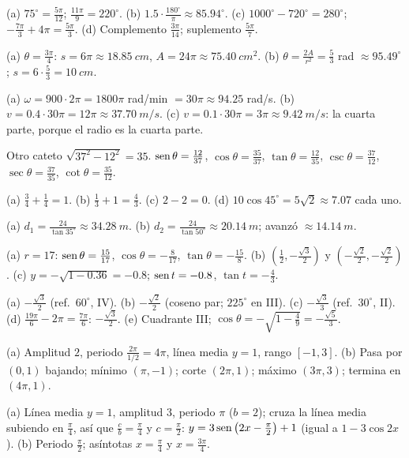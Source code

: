 \documentclass[11pt,a4paper]{article}
\begin{document}
\respuestas
\begin{respuestascortas}
\begin{soluciones}
\item (a) $75^\circ=\tfrac{5\pi}{12}$; $\tfrac{11\pi}{9}=220^\circ$. (b) $1.5\cdot\tfrac{180^\circ}{\pi}\approx85.94^\circ$.
  (c) $1000^\circ-720^\circ=280^\circ$; $-\tfrac{7\pi}{3}+4\pi=\tfrac{5\pi}{3}$. (d) Complemento $\tfrac{3\pi}{14}$; suplemento $\tfrac{5\pi}{7}$.
\item (a) $\theta=\tfrac{3\pi}{4}$: $s=6\pi\approx\SI{18.85}{cm}$, $A=24\pi\approx\SI{75.40}{cm^2}$.
  (b) $\theta=\tfrac{2A}{r^2}=\tfrac53$ rad $\approx95.49^\circ$; $s=6\cdot\tfrac53=\SI{10}{cm}$.
\item (a) $\omega=900\cdot2\pi=1800\pi$ rad/min $=30\pi\approx94.25$ rad/s. (b) $v=0.4\cdot30\pi=12\pi\approx\SI{37.70}{m/s}$.
  (c) $v=0.1\cdot30\pi=3\pi\approx\SI{9.42}{m/s}$: la cuarta parte, porque el radio es la cuarta parte.
\item Otro cateto $\sqrt{37^2-12^2}=35$. $\operatorname{sen}\theta=\tfrac{12}{37}$, $\cos\theta=\tfrac{35}{37}$, $\tan\theta=\tfrac{12}{35}$,
  $\csc\theta=\tfrac{37}{12}$, $\sec\theta=\tfrac{37}{35}$, $\cot\theta=\tfrac{35}{12}$.
\item (a) $\tfrac34+\tfrac14=1$. (b) $\tfrac13+1=\tfrac43$. (c) $2-2=0$. (d) $10\cos45^\circ=5\sqrt2\approx7.07$ cada uno.
\item (a) $d_1=\tfrac{24}{\tan35^\circ}\approx\SI{34.28}{m}$. (b) $d_2=\tfrac{24}{\tan50^\circ}\approx\SI{20.14}{m}$; avanzó
  $\approx\SI{14.14}{m}$.
\item (a) $r=17$: $\operatorname{sen}\theta=\tfrac{15}{17}$, $\cos\theta=-\tfrac{8}{17}$, $\tan\theta=-\tfrac{15}{8}$.
  (b) $\left(\tfrac12,-\tfrac{\sqrt3}{2}\right)$ y $\left(-\tfrac{\sqrt2}{2},-\tfrac{\sqrt2}{2}\right)$.
  (c) $y=-\sqrt{1-0.36}=-0.8$; $\operatorname{sen} t=-0.8$, $\tan t=-\tfrac43$.
\item (a) $-\tfrac{\sqrt3}{2}$ (ref.\ $60^\circ$, IV). (b) $-\tfrac{\sqrt2}{2}$ (coseno par; $225^\circ$ en III).
  (c) $-\tfrac{\sqrt3}{3}$ (ref.\ $30^\circ$, II). (d) $\tfrac{19\pi}{6}-2\pi=\tfrac{7\pi}{6}$: $-\tfrac{\sqrt3}{2}$.
  (e) Cuadrante III; $\cos\theta=-\sqrt{1-\tfrac49}=-\tfrac{\sqrt5}{3}$.
\item (a) Amplitud $2$, periodo $\tfrac{2\pi}{1/2}=4\pi$, línea media $y=1$, rango $[-1,3]$.
  (b) Pasa por $(0,1)$ bajando; mínimo $(\pi,-1)$; corte $(2\pi,1)$; máximo $(3\pi,3)$; termina en $(4\pi,1)$.
\item (a) Línea media $y=1$, amplitud $3$, periodo $\pi$ ($b=2$); cruza la línea media subiendo en $\tfrac{\pi}{4}$, así
  que $\tfrac cb=\tfrac{\pi}{4}$ y $c=\tfrac{\pi}{2}$: $y=3\operatorname{sen}\left(2x-\tfrac{\pi}{2}\right)+1$ (igual a $1-3\cos2x$).
  (b) Periodo $\tfrac{\pi}{2}$; asíntotas $x=\tfrac{\pi}{4}$ y $x=\tfrac{3\pi}{4}$.
\end{soluciones}
\end{respuestascortas}
\end{document}
